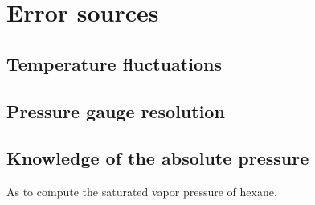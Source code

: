 

  \section{Error sources}

      \subsection{Temperature fluctuations}


      \subsection{Pressure gauge resolution}


      \subsection{Knowledge of the absolute pressure}
          As to compute the saturated vapor pressure of hexane.
